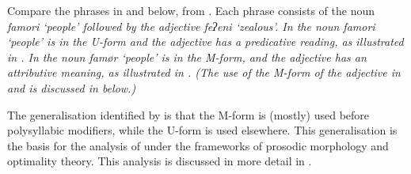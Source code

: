Compare the phrases in  and  below, from \citet[14]{ch40}.
Each phrase consists of the noun \it{famori} `people'
followed by the adjective \it{feʔeni} `zealous'.
In  the noun \it{famori} `people' is in the U-form
and the adjective has a predicative reading,
as illustrated in .
In  the noun \it{famør} `people' is in the M-form,
and the adjective has an attributive meaning,
as illustrated in .
(The use of the M-form of the adjective in 
and  is discussed in  below.)

\begin{multicols}{2}
	\begin{exe}\let\eachwordone=\it
		\label{ex:ThePeoAre}
		\label{ex:TheZeaPeo}
	\end{exe}
\end{multicols}
\begin{multicols}{2}
	\begin{exe}
		\label{tr:ThePeoAre}
		\label{tr:TheZeaPeo}
	\end{exe}
\end{multicols}

The generalisation identified by \citet{haki98}
is that the M-form is (mostly) used before polysyllabic modifiers,
while the U-form is used elsewhere.
This generalisation is the basis for the analysis
of \cite{mcc00} under the frameworks of prosodic
morphology and optimality theory.
This analysis is discussed in more detail in .

